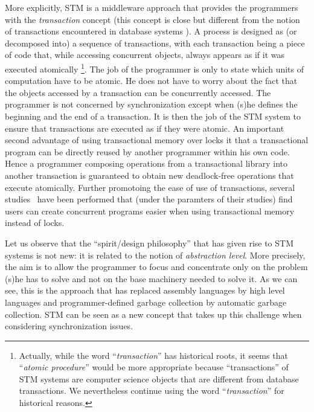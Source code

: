 More explicitly,  STM  is a middleware approach that provides the 
programmers  with the {\it transaction} concept (this concept 
is close but different from the notion of transactions encountered in 
database systems \cite{FFGH08,HCUAGSV07,HL08}).
 A process is designed as 
(or decomposed into)  a sequence of transactions, with each transaction 
being a piece  of code that, while  accessing  concurrent  objects, 
always  appears as if it was  executed atomically
\footnote{Actually,  
while the word {``\it transaction}'' has historical roots, it seems that 
{``\it atomic procedure}'' would be more appropriate because 
``transactions''  of STM systems are  computer science objects 
that are different  from database transactions.  We nevertheless 
continue using the word  {``\it transaction}'' for historical reasons.}.
The job of the programmer is only to state which  units of computation
have  to be atomic.  He does not have to worry about the fact that the 
objects accessed by  a transaction can be concurrently accessed. 
The programmer is not concerned by synchronization
except when (s)he defines the beginning and the end of a  transaction.
It  is then the job of the 
STM system to ensure that transactions are executed as if they were atomic. 
An important second advantage of using transactional memory over locks it that a transactional program
can be directly reused by another programmer within his own code.
Hence a programmer composing operations from a transactional library into another 
transaction is guaranteed to obtain new deadlock-free operations that execute atomically.
Further promotoing the ease of use of transactions, several studies~\cite{PA11,RHW10}
have been performed that (under the paramters of their studies) find users can create concurrent programs
easier when using transactional memory instead of locks.


Let us observe that  the ``spirit/design philosophy'' that has given 
rise to  STM systems is not new: it is related to the notion of 
{\it abstraction level}.   
More precisely,  the  aim  is   to allow  the programmer  to  focus and
concentrate only  on the problem  (s)he has to
solve and not on the base machinery needed to solve it. 
As we can see, this is the approach  that  has   replaced assembly languages  
by  high level languages and programmer-defined garbage collection 
by automatic garbage collection.   STM can  be seen as a  new concept
that takes  up  this challenge when considering synchronization issues. 


